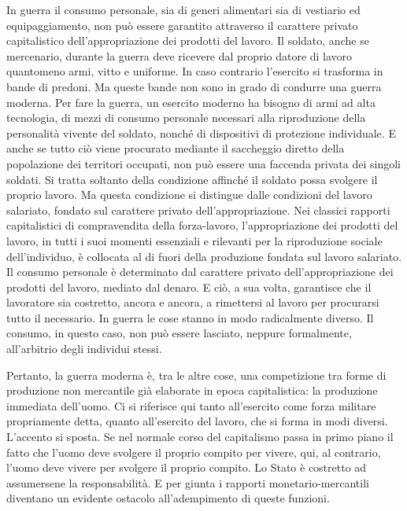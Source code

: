 \documentclass[../main]{subfiles}
\begin{document}
In guerra il consumo personale, sia di generi alimentari sia di vestiario ed equipaggiamento, non può essere garantito attraverso il carattere privato capitalistico dell'appropriazione dei prodotti del lavoro. Il soldato, anche se mercenario, durante la guerra deve ricevere dal proprio datore di lavoro quantomeno armi, vitto e uniforme. In caso contrario l'esercito si trasforma in bande di predoni. Ma queste bande non sono in grado di condurre una guerra moderna. Per fare la guerra, un esercito moderno ha bisogno di armi ad alta tecnologia, di mezzi di consumo personale necessari alla riproduzione della personalità vivente del soldato, nonché di dispositivi di protezione individuale. E anche se tutto ciò viene procurato mediante il saccheggio diretto della popolazione dei territori occupati, non può essere una faccenda privata dei singoli soldati. Si tratta soltanto della condizione affinché il soldato possa svolgere il proprio lavoro. Ma questa condizione si distingue dalle condizioni del lavoro salariato, fondato sul carattere privato dell'appropriazione. Nei classici rapporti capitalistici di compravendita della forza-lavoro, l'appropriazione dei prodotti del lavoro, in tutti i suoi momenti essenziali e rilevanti per la riproduzione sociale dell'individuo, è collocata al di fuori della produzione fondata sul lavoro salariato. Il consumo personale è determinato dal carattere privato dell'appropriazione dei prodotti del lavoro, mediato dal denaro. E ciò, a sua volta, garantisce che il lavoratore sia costretto, ancora e ancora, a rimettersi al lavoro per procurarsi tutto il necessario. In guerra le cose stanno in modo radicalmente diverso. Il consumo, in questo caso, non può essere lasciato, neppure formalmente, all'arbitrio degli individui stessi.

Pertanto, la guerra moderna è, tra le altre cose, una competizione tra forme di produzione non mercantile già elaborate in epoca capitalistica: la produzione immediata dell'uomo. Ci si riferisce qui tanto all'esercito come forza militare propriamente detta, quanto all'esercito del lavoro, che si forma in modi diversi. L'accento si sposta. Se nel normale corso del capitalismo passa in primo piano il fatto che l'uomo deve svolgere il proprio compito per vivere, qui, al contrario, l'uomo deve vivere per svolgere il proprio compito. Lo Stato è costretto ad assumersene la responsabilità. E per giunta i rapporti monetario-mercantili diventano un evidente ostacolo all'adempimento di queste funzioni.
\end{document}
